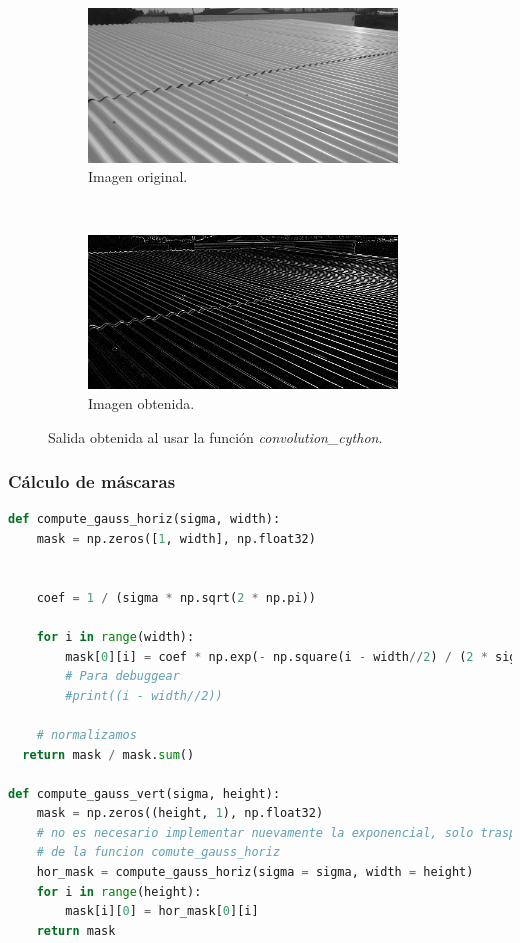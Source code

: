 \documentclass[12pt, letterpaper]{article}
\begin{document}
\begin{figure}[H]
  \centering
  \begin{subfigure}[t]{0.45\textwidth}
    \centering
    \includegraphics[width = 0.9\textwidth]{techo.png}
    \caption{Imagen original.}
  \end{subfigure}
  ~ 
  \begin{subfigure}[t]{0.45\textwidth}
      \centering
      \includegraphics[width = 0.9\textwidth]{conv/techoconv.png}
      \caption{Imagen obtenida.}
  \end{subfigure}
  \caption{Salida obtenida al usar la función \textit{convolution\_cython}.}
  \label{convcython}
\end{figure}

\subsubsection{Cálculo de máscaras}

\begin{lstlisting}[language=Python, label = maskCode, caption=Cálculo de las máscaras en Python.]
def compute_gauss_horiz(sigma, width):
	mask = np.zeros([1, width], np.float32)

	
	coef = 1 / (sigma * np.sqrt(2 * np.pi))
 
	for i in range(width):
		mask[0][i] = coef * np.exp(- np.square(i - width//2) / (2 * sigma*sigma) )
		# Para debuggear
		#print((i - width//2))
	
	# normalizamos
  return mask / mask.sum()
  
def compute_gauss_vert(sigma, height):
	mask = np.zeros((height, 1), np.float32)
	# no es necesario implementar nuevamente la exponencial, solo trasponer el resultado
	# de la funcion comute_gauss_horiz
	hor_mask = compute_gauss_horiz(sigma = sigma, width = height)
	for i in range(height):
		mask[i][0] = hor_mask[0][i]
	return mask
\end{lstlisting}
\end{document}
